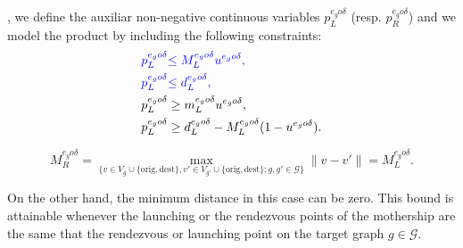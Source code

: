 \noindent
{}, we define the auxiliar non-negative continuous variables $p_L^{e_go\delta}$ (resp. $p_R^{e_go\delta}$) and we model the product by including the following constraints:
\begin{align*}
{\color{blue}p_L^{e_go\delta}} & {\color{blue}\leq  M_L^{e_go\delta}u^{e_go\delta},}\\
{\color{blue}p_L^{e_go\delta}} & {\color{blue}\leq d_L^{e_go\delta},} \\
p_L^{e_go\delta} & \geq m_L^{e_go\delta} u^{e_go\delta}, \\
p_L^{e_go\delta} & \geq d_L^{e_go\delta} - M_L^{e_go\delta}(1-u^{e_go\delta}).
\end{align*}

$$
M_R^{e_go\delta} = \max_{\{v\in V_g\cup\{\text{orig}, \text{dest}\}, v'\in V_{g'}\cup\{\text{orig}, \text{dest}\} : g, g'\in\mathcal G\}} \|v - v'\| = M_L^{e_go\delta}.
$$

\noindent
On the other hand, the minimum distance in this case can be zero. This bound is attainable whenever the launching or the rendezvous points of the mothership are the same that the rendezvous or launching point on the target graph $g\in \mathcal{G}$.


